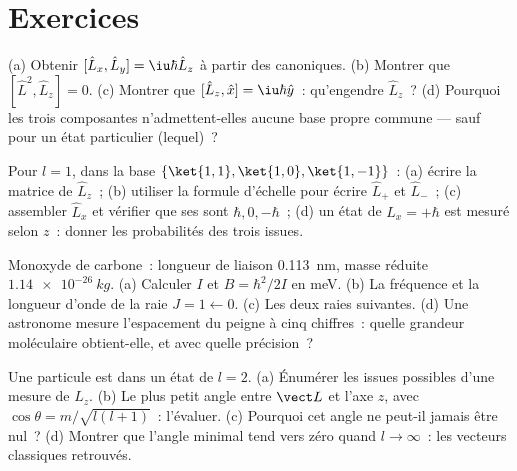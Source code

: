 \section{Exercices}

\begin{exercise}[$\star$]\label{exo:b3:quantum-angular-momentum:1}
(a) Obtenir $[\hat L_x, \hat L_y] = \iu\hbar\hat L_z$ à partir des
 canoniques. (b) Montrer que $[\hat L^2, \hat L_z] = 0$.
(c) Montrer que $[\hat L_z, \hat x] = \iu\hbar\hat y$~: qu'engendre
$\hat L_z$~? (d) Pourquoi les trois composantes n'admettent-elles
aucune base propre commune --- sauf pour un état particulier (lequel)~?
\end{exercise}

\begin{exercise}[$\star$]\label{exo:b3:quantum-angular-momentum:2}
Pour $l = 1$, dans la base $\{\ket{1,1}, \ket{1,0}, \ket{1,-1}\}$~:
(a) écrire la matrice de $\hat L_z$~; (b) utiliser la formule
d'échelle pour écrire $\hat L_+$ et $\hat L_-$~; (c) assembler
$\hat L_x$ et vérifier que ses  sont $\hbar, 0, -\hbar$~; (d) un état de $L_x =
+\hbar$ est mesuré selon $z$~: donner les probabilités des trois
issues.
\end{exercise}

\begin{exercise}[$\star$]\label{exo:b3:quantum-angular-momentum:3}
Monoxyde de carbone~: longueur de liaison \qty{0.113}{nm}, masse
réduite $\qty{1.14e-26}{kg}$. (a) Calculer $I$ et $B = \hbar^2/2I$ en
meV. (b) La fréquence et la longueur d'onde de la raie
$J = 1 \leftarrow 0$. (c) Les deux raies suivantes. (d) Une astronome
mesure l'espacement du peigne à cinq chiffres~: quelle grandeur
moléculaire obtient-elle, et avec quelle précision~?
\end{exercise}

\begin{exercise}[$\star$]\label{exo:b3:quantum-angular-momentum:4}
Une particule est dans un état de $l = 2$. (a) Énumérer les issues
possibles d'une mesure de $L_z$. (b) Le plus petit angle entre
$\vect L$ et l'axe $z$, avec $\cos\theta = m/\sqrt{l(l+1)}$~:
l'évaluer. (c) Pourquoi cet angle ne peut-il jamais être nul~? (d)
Montrer que l'angle minimal tend vers zéro quand $l \to \infty$~: les
vecteurs classiques retrouvés.
\end{exercise}

